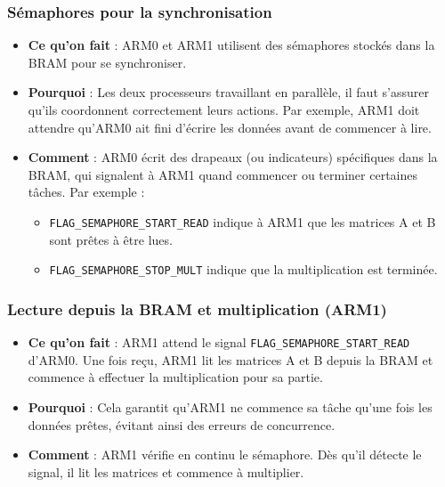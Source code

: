 \documentclass[../CSC_5RO06_TA.tex]{subfiles}
\begin{document}
\subsubsection{Sémaphores pour la synchronisation}
\begin{itemize}
\item \textbf{Ce qu’on fait} : ARM0 et ARM1 utilisent des sémaphores stockés dans la BRAM pour se synchroniser.

\item \textbf{Pourquoi} : Les deux processeurs travaillant en parallèle, il faut s'assurer qu'ils coordonnent correctement leurs actions. Par exemple, ARM1 doit attendre qu'ARM0 ait fini d'écrire les données avant de commencer à lire.

\item \textbf{Comment} : ARM0 écrit des drapeaux (ou indicateurs) spécifiques dans la BRAM, qui signalent à ARM1 quand commencer ou terminer certaines tâches. Par exemple :
\begin{itemize}
    \item \texttt{FLAG\_SEMAPHORE\_START\_READ} indique à ARM1 que les matrices A et B sont prêtes à être lues.
    \item \texttt{FLAG\_SEMAPHORE\_STOP\_MULT} indique que la multiplication est terminée.
\end{itemize}
\end{itemize}

\subsubsection{Lecture depuis la BRAM et multiplication (ARM1)}
\begin{itemize}
\item \textbf{Ce qu’on fait} : ARM1 attend le signal \texttt{FLAG\_SEMAPHORE\_START\_READ} d'ARM0. Une fois reçu, ARM1 lit les matrices A et B depuis la BRAM et commence à effectuer la multiplication pour sa partie.

\item \textbf{Pourquoi} : Cela garantit qu'ARM1 ne commence sa tâche qu'une fois les données prêtes, évitant ainsi des erreurs de concurrence.

\item \textbf{Comment} : ARM1 vérifie en continu le sémaphore. Dès qu'il détecte le signal, il lit les matrices et commence à multiplier.
\end{itemize}
\end{document}
